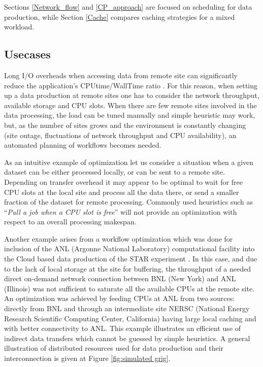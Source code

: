 \documentclass[english]{ddny}
\begin{document}
Sections \ref{Network_flow} and \ref{CP_approach} are focused on scheduling for data production, while Section \ref{Cache} compares caching strategies for a mixed workload. 

\subsection{Usecases}
Long I/O overheads when accessing data from remote site can significantly reduce the application's CPUtime/WallTime ratio \cite{HorkyACAT,Betev}. For this reason, when setting up a data production at remote sites one has to consider the network throughput, available storage and CPU slots. When there are few remote sites involved in the data processing, the load can be tuned manually and simple heuristic may work, but, as the number of sites grows and the environment is constantly changing (site outage, fluctuations of network throughput and CPU availability), an automated planning of workflows becomes needed. 

As an intuitive example of optimization let us consider a situation when a given dataset can be either processed locally, or can be sent to a remote site. Depending on transfer overhead it may appear to be optimal to wait for free CPU slots at the local site and process all the data there, or send a smaller fraction of the dataset for remote processing. Commonly used heuristics such as ``\textit{Pull a job when a CPU slot is free}'' will not provide an optimization with respect to an overall processing makespan.  

Another example arises from a workflow optimization which was done for inclusion of the ANL (Argonne National Laboratory) computational facility into the Cloud based data production of the STAR experiment \cite{Balewski}. In this case, and due to the lack of local storage at the site for buffering, the throughput of a needed direct on-demand network connection between BNL (New York) and ANL (Illinois) was not sufficient to saturate all the available CPUs at the remote site. An optimization was achieved by feeding CPUs at ANL from two sources: directly from BNL and through an intermediate site NERSC (National Energy Research Scientific Computing Center, California) having large local caching and with better connectivity to ANL. This example illustrates an efficient use of indirect data transfers which cannot be guessed by simple heuristics. A general illustration of distributed resources used for data production and their interconnection is given at Figure \ref{fig:simulated grig}.
\end{document}
